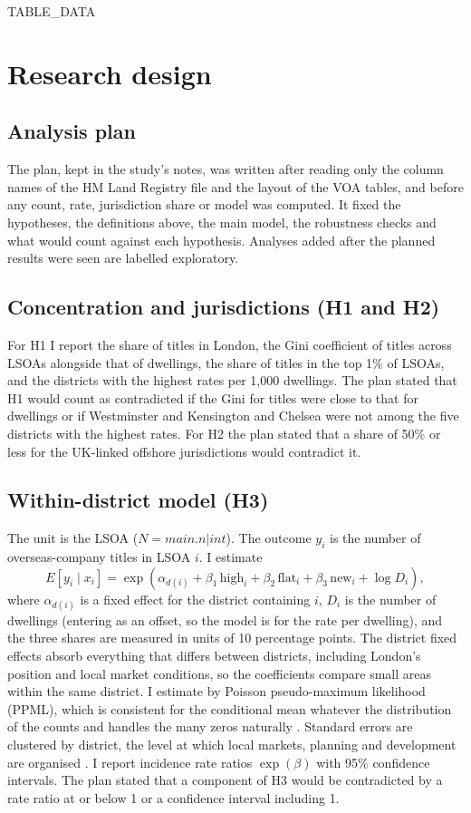 \documentclass[11pt,a4paper]{article}
\begin{document}
{{TABLE_DATA}}

\section{Research design}\label{sec:design}
\subsection{Analysis plan}
The plan, kept in the study's notes, was written after reading only the column names of the HM Land Registry file and the layout of the VOA tables, and before any count, rate, jurisdiction share or model was computed. It fixed the hypotheses, the definitions above, the main model, the robustness checks and what would count against each hypothesis. Analyses added after the planned results were seen are labelled exploratory.

\subsection{Concentration and jurisdictions (H1 and H2)}
For H1 I report the share of titles in London, the Gini coefficient of titles across LSOAs alongside that of dwellings, the share of titles in the top 1\% of LSOAs, and the districts with the highest rates per 1,000 dwellings. The plan stated that H1 would count as contradicted if the Gini for titles were close to that for dwellings or if Westminster and Kensington and Chelsea were not among the five districts with the highest rates. For H2 the plan stated that a share of 50\% or less for the UK-linked offshore jurisdictions would contradict it.

\subsection{Within-district model (H3)}
The unit is the LSOA ($N = {{main.n|int}}$). The outcome $y_i$ is the number of overseas-company titles in LSOA $i$. I estimate
\begin{equation}
E[y_i \mid x_i] = \exp\left(\alpha_{d(i)} + \beta_1\,\textrm{high}_i + \beta_2\,\textrm{flat}_i + \beta_3\,\textrm{new}_i + \log D_i\right),
\end{equation}
where $\alpha_{d(i)}$ is a fixed effect for the district containing $i$, $D_i$ is the number of dwellings (entering as an offset, so the model is for the rate per dwelling), and the three shares are measured in units of 10 percentage points. The district fixed effects absorb everything that differs between districts, including London's position and local market conditions, so the coefficients compare small areas within the same district. I estimate by Poisson pseudo-maximum likelihood (PPML), which is consistent for the conditional mean whatever the distribution of the counts and handles the many zeros naturally \citep{santos2006,correia2020}. Standard errors are clustered by district, the level at which local markets, planning and development are organised \citep{cameron2015,abadie2023}. I report incidence rate ratios $\exp(\beta)$ with 95\% confidence intervals. The plan stated that a component of H3 would be contradicted by a rate ratio at or below 1 or a confidence interval including 1.
\end{document}
